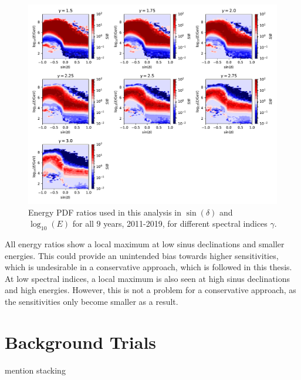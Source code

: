 \begin{figure}
    \centering
    \includegraphics[width=\linewidth]{Plots/05_csky/energy_pdf_ratio.pdf}
    \caption{Energy PDF ratios used in this analysis in $\sin{(\delta)}$ and $\log_{10}{(E)}$ for all $\num{9}$ years, 2011-2019, for different spectral indices $\gamma$.}
    \label{fig:energy_ratio_time_int}
\end{figure}

All energy ratios show a local maximum at low sinus declinations and smaller energies.
This could provide an unintended bias towards higher sensitivities, which is undesirable in a conservative approach, which is followed in this thesis.
At low spectral indices, a local maximum is also seen at high sinus declinations and high energies.
However, this is not a problem for a conservative approach, as the sensitivities only become smaller as a result.

\section{Background Trials}

mention stacking

